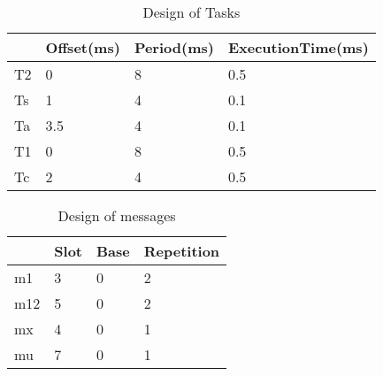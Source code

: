 \begin{table}[]
\centering
\begin{tabular}{|l|l|l|l|}
\hline
   & Offset(ms) & Period(ms) & ExecutionTime(ms) \\ \hline
T2 & 0          & 8          & 0.5               \\ \hline
Ts & 1          & 4          & 0.1               \\ \hline
Ta & 3.5        & 4          & 0.1               \\ \hline
T1 & 0          & 8          & 0.5               \\ \hline
Tc & 2          & 4          & 0.5               \\ \hline
\end{tabular}
\label{tab:flextsk}
\caption{Design of Tasks}
\end{table}


\begin{table}[]
	\centering
	
	\begin{tabular}{|l|l|l|l|}
		\hline
		& Slot & Base & Repetition \\ \hline
		m1  & 3    & 0    & 2          \\ \hline
		m12 & 5    & 0    & 2          \\ \hline
		mx  & 4    & 0    & 1          \\ \hline
		mu  & 7    & 0    & 1          \\ \hline
	\end{tabular}
	\label{tab:flexmsg}
	\caption{Design of messages}
\end{table}